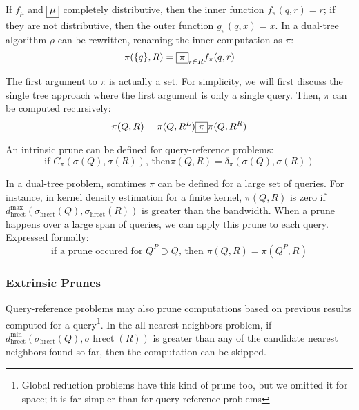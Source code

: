 \documentclass[times, 10pt,twocolumn]{article}
\DeclareMathOperator{\hrect}{hrect}
\newcommand{\kdleft}{^L}
\newcommand{\kdright}{^R}
\newcommand{\kdparent}{^P}
\newcommand{\allpi}{\pi}
\newcommand{\Oppi}{\fbox{$\pi$}}
\newcommand{\oppi}{\fbox{$\pi$}}
\newcommand{\fpi}{f_{\pi}}
\newcommand{\gpi}{g_{\pi}}
\newcommand{\canprunepi}{C_{\pi}}
\newcommand{\deltapi}{\delta_{\pi}}
\newcommand{\allrho}{\rho}
\newcommand{\Opmu}{\fbox{$\mu$}}
\newcommand{\fmu}{f_{\mu}}
\begin{document}
\noindent If $\fmu$ and $\Opmu$ completely distributive, then the inner function $\fpi(q, r) = r$; if they are not distributive, then the outer function $\gpi(q, x) = x$.
In a dual-tree algorithm $\allrho$ can be rewritten, renaming the inner computation as $\allpi$:
\begin{equation}
\allpi(\{q\}, R) = \Oppi_{r \in R} \fpi(q, r)
\label{eqn:defpi}
\end{equation}

\noindent The first argument to $\allpi$ is actually a set.
For simplicity, we will first discuss the single tree approach where the first argument is only a single query.
Then, $\allpi$ can be computed recursively:
\begin{equation}
\allpi(Q, R) = \allpi(Q, R\kdleft) \oppi \allpi(Q, R\kdright)
\label{eqn:dividepi}
\end{equation}

\noindent An intrinsic prune can be defined for query-reference problems:
\begin{equation}
\text{if } \canprunepi(\sigma(Q), \sigma(R)) \text{, then} \allpi(Q, R) = \deltapi(\sigma(Q), \sigma(R))
\label{eqn:prunepi}
\end{equation}

In a dual-tree problem, somtimes $\allpi$ can be defined for a large set of queries.
For instance, in kernel density estimation for a finite kernel, $\allpi(Q, R)$ is zero if $d^{\max}_{\hrect}(\sigma_{\hrect}(Q), \sigma_{\hrect}(R))$ is greater than the bandwidth.
When a prune happens over a large span of queries, we can apply this prune to each query.
Expressed formally:
\begin{equation}
\text{if a prune occured for } Q\kdparent \supset Q \text{, then } \allpi(Q, R) = \allpi(Q\kdparent, R)
\end{equation}

\subsubsection{Extrinsic Prunes}

Query-reference problems may also prune computations based on previous results computed for a query\footnote{Global reduction problems have this kind of prune too, but we omitted it for space; it is far simpler than for query reference problems}.
In the all nearest neighbors problem, if $d^{\min}_{\hrect}(\sigma_{\hrect}(Q), \sigma{\hrect}(R))$ is greater than any of the candidate nearest neighbors found so far, then the computation can be skipped.
\end{document}
